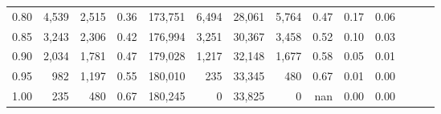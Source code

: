 \begin{tabular}{rrrrrrrrrrrrrr}
0.80 &   4,539 &  2,515 &  0.36 &  173,751 &    6,494 &  28,061 &   5,764 &  0.47 &  0.17 &      0.06 \\
0.85 &   3,243 &  2,306 &  0.42 &  176,994 &    3,251 &  30,367 &   3,458 &  0.52 &  0.10 &      0.03 \\
0.90 &   2,034 &  1,781 &  0.47 &  179,028 &    1,217 &  32,148 &   1,677 &  0.58 &  0.05 &      0.01 \\
0.95 &     982 &  1,197 &  0.55 &  180,010 &      235 &  33,345 &     480 &  0.67 &  0.01 &      0.00 \\
1.00 &     235 &    480 &  0.67 &  180,245 &        0 &  33,825 &       0 &   nan &  0.00 &      0.00 \\
\bottomrule
\end{tabular}
